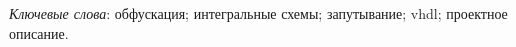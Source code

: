 \thispagestyle{empty}

\emph{Ключевые слова}: обфускация; интегральные схемы; запутывание; vhdl; проектное описание.

\vspace{4\parsep}






\clearpage
